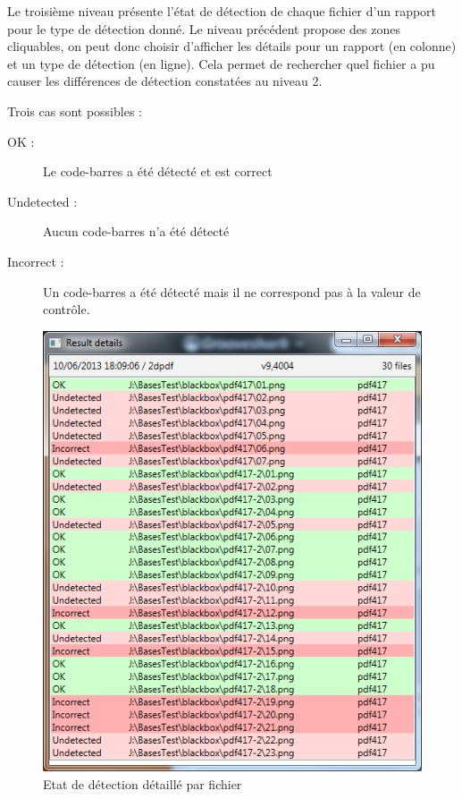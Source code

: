 \clearpage

Le troisième niveau présente l'état de détection de chaque fichier d'un rapport pour le type de détection donné. Le niveau précédent propose des zones cliquables, on peut donc choisir d'afficher les détails pour un rapport (en colonne) et un type de détection (en ligne). Cela permet de rechercher quel fichier a pu causer les différences de détection constatées au niveau 2.

Trois cas sont possibles :
\begin{description}
\item[OK :] Le code-barres a été détecté et est correct
\item[Undetected :] Aucun code-barres n'a été détecté
\item[Incorrect :] Un code-barres a été détecté mais il ne correspond pas à la valeur de contrôle.
\end{description}

\begin{figure}
\begin{center}
\includegraphics[scale=0.6]{images/projet1RapportWindow3.png}
\end{center}
\caption{Etat de détection détaillé par fichier}
\label{niveau3}
\end{figure}

